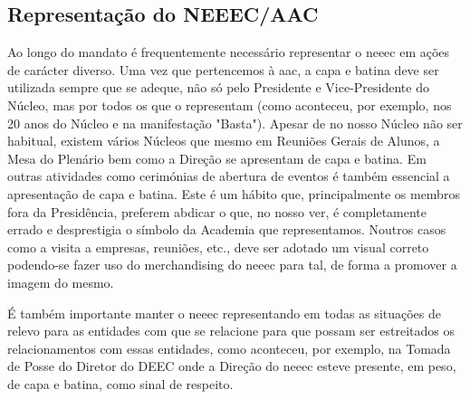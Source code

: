 \subsection{Representação do NEEEC/AAC}

Ao longo do mandato é frequentemente necessário representar o \acrshort{neeec} em ações de carácter diverso. Uma vez que pertencemos à \acrfull{aac}, a capa e batina deve ser utilizada sempre que se adeque, não só pelo Presidente e Vice-Presidente do Núcleo, mas por todos os que o representam (como aconteceu, por exemplo, nos 20 anos do Núcleo e na manifestação "Basta"). Apesar de no nosso Núcleo não ser habitual, existem vários Núcleos que mesmo em Reuniões Gerais de Alunos, a Mesa do Plenário bem como a Direção se apresentam de capa e batina. Em outras atividades como cerimónias de abertura de eventos é também essencial a apresentação de capa e batina. Este é um hábito que, principalmente os membros fora da Presidência, preferem abdicar o que, no nosso ver, é completamente errado e desprestigia o símbolo da Academia que representamos. Noutros casos como a visita a empresas, reuniões, etc., deve ser adotado um visual correto podendo-se fazer uso do merchandising do \acrshort{neeec} para tal, de forma a promover a imagem do mesmo.

É também importante manter o \acrshort{neeec} representando em todas as situações de relevo para as entidades com que se relacione para que possam ser estreitados os relacionamentos com essas entidades, como aconteceu, por exemplo, na Tomada de Posse do Diretor do DEEC onde a Direção do \acrshort{neeec} esteve presente, em peso, de capa e batina, como sinal de respeito.